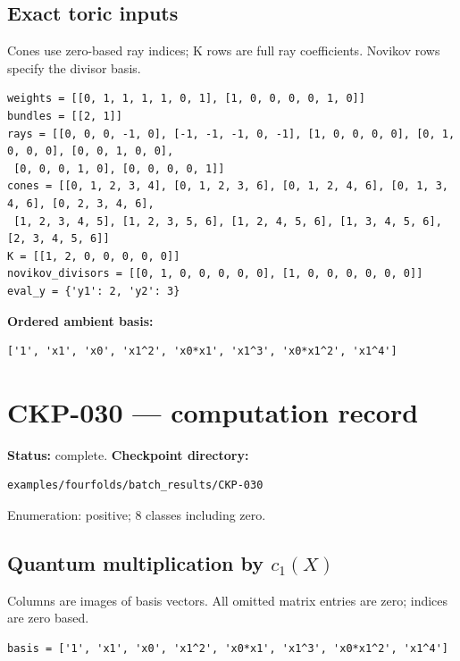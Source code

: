 \documentclass[10pt,a4paper]{article}
\begin{document}
\subsection*{Exact toric inputs}
Cones use zero-based ray indices; K rows are full ray coefficients. Novikov rows specify the divisor basis.

\begin{lstlisting}
weights = [[0, 1, 1, 1, 1, 0, 1], [1, 0, 0, 0, 0, 1, 0]]
bundles = [[2, 1]]
rays = [[0, 0, 0, -1, 0], [-1, -1, -1, 0, -1], [1, 0, 0, 0, 0], [0, 1, 0, 0, 0], [0, 0, 1, 0, 0],
 [0, 0, 0, 1, 0], [0, 0, 0, 0, 1]]
cones = [[0, 1, 2, 3, 4], [0, 1, 2, 3, 6], [0, 1, 2, 4, 6], [0, 1, 3, 4, 6], [0, 2, 3, 4, 6],
 [1, 2, 3, 4, 5], [1, 2, 3, 5, 6], [1, 2, 4, 5, 6], [1, 3, 4, 5, 6], [2, 3, 4, 5, 6]]
K = [[1, 2, 0, 0, 0, 0, 0]]
novikov_divisors = [[0, 1, 0, 0, 0, 0, 0], [1, 0, 0, 0, 0, 0, 0]]
eval_y = {'y1': 2, 'y2': 3}
\end{lstlisting}

\textbf{Ordered ambient basis:}
\begin{lstlisting}
['1', 'x1', 'x0', 'x1^2', 'x0*x1', 'x1^3', 'x0*x1^2', 'x1^4']
\end{lstlisting}

\clearpage\section*{CKP-030 --- computation record}
\textbf{Status:} complete.
\textbf{Checkpoint directory:}
\begin{lstlisting}
examples/fourfolds/batch_results/CKP-030
\end{lstlisting}

Enumeration: positive; 8 classes including zero.
\subsection*{Quantum multiplication by $c_1(X)$}
Columns are images of basis vectors. All omitted matrix entries are zero; indices are zero based.

\begin{lstlisting}
basis = ['1', 'x1', 'x0', 'x1^2', 'x0*x1', 'x1^3', 'x0*x1^2', 'x1^4']
\end{lstlisting}
\end{document}
